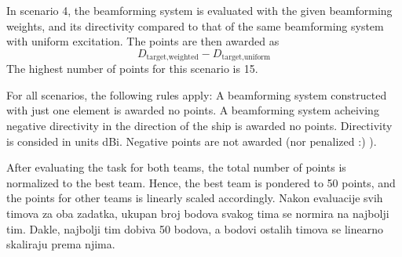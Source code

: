 \documentclass{article}[a4paper]
\begin{document}
In scenario 4, the beamforming system is evaluated with the given beamforming weights, and its directivity compared to that of the same beamforming system with uniform excitation. The points are then awarded as
\[ D_\textrm{target,weighted} - D_\textrm{target,uniform} \]
The highest number of points for this scenario is 15.

For all scenarios, the following rules apply: A beamforming system constructed with just one element is awarded no points. A beamforming system acheiving negative directivity in the direction of the ship is awarded no points. Directivity is consided in units dBi. Negative points are not awarded (nor penalized :) ).

After evaluating the task for both teams, the total number of points is normalized to the best team. Hence, the best team is pondered to 50 points, and the points for other teams is linearly scaled accordingly.
Nakon evaluacije svih timova za oba zadatka, ukupan broj bodova svakog tima se normira na najbolji tim. Dakle, najbolji tim dobiva 50 bodova, a bodovi ostalih timova se linearno skaliraju prema njima.
\end{document}

